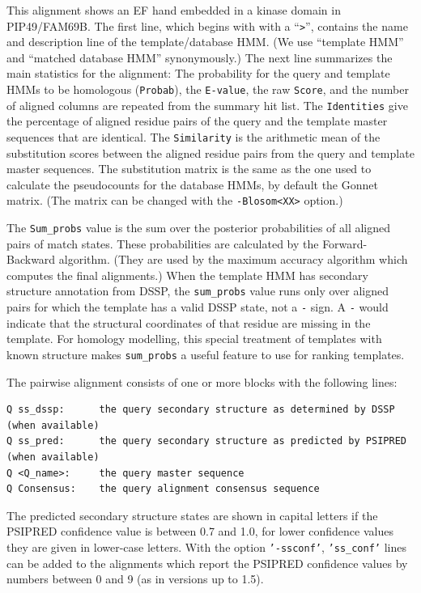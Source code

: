 \documentclass[11pt,a4paper]{article}
\begin{document}
This alignment shows an EF hand embedded in a kinase domain in PIP49/FAM69B. The first line, 
which begins with with a ``\verb`>`'', contains the name and description line of the template/database 
HMM. (We use ``template HMM'' and ``matched database HMM'' synonymously.) 
The next line summarizes the main statistics for the alignment: The probability for the query and 
template HMMs to be homologous (\verb`Probab`), the \verb`E-value`, the raw \verb`Score`, and the 
number of aligned columns are repeated from the summary hit list. The \verb`Identities` give the percentage
of aligned residue pairs of the query and the template master sequences that are identical. 
The \verb`Similarity` is the arithmetic mean of the substitution scores between the aligned residue
pairs from the query and template master sequences. The substitution matrix is the same as the
one used to calculate the pseudocounts for the database HMMs, by default the Gonnet matrix. 
(The matrix can be changed with the \verb`-Blosom<XX>` option.) 

The \verb`Sum_probs` value is the sum over the posterior probabilities of all aligned pairs 
of match states. These probabilities are calculated by the Forward-Backward algorithm. 
(They are used by the maximum accuracy algorithm 
which computes the final alignments.) When the template HMM has secondary structure annotation from
DSSP, the \verb`sum_probs` value runs only over aligned pairs for which the template has a 
valid DSSP state, not a \verb`-` sign. A  \verb`-` would indicate that the structural coordinates of
that residue are missing in the template. For homology modelling, this special treatment of templates 
with known structure makes \verb`sum_probs` a useful feature to use for ranking templates.



The pairwise alignment consists of one or more blocks with the following lines:

\small
\begin{verbatim}
Q ss_dssp:      the query secondary structure as determined by DSSP (when available)
Q ss_pred:      the query secondary structure as predicted by PSIPRED (when available)
Q <Q_name>:     the query master sequence
Q Consensus:    the query alignment consensus sequence
\end{verbatim}\normalsize

The predicted secondary structure states are shown in capital letters if the PSIPRED
confidence value is between 0.7 and 1.0, for lower confidence values they are given 
in lower-case letters. With the option {\tt '-ssconf'}, {\tt 'ss\_conf'} lines can 
be added to the alignments which report the PSIPRED confidence values by numbers 
between 0 and 9 (as in versions up to 1.5).
\end{document}
